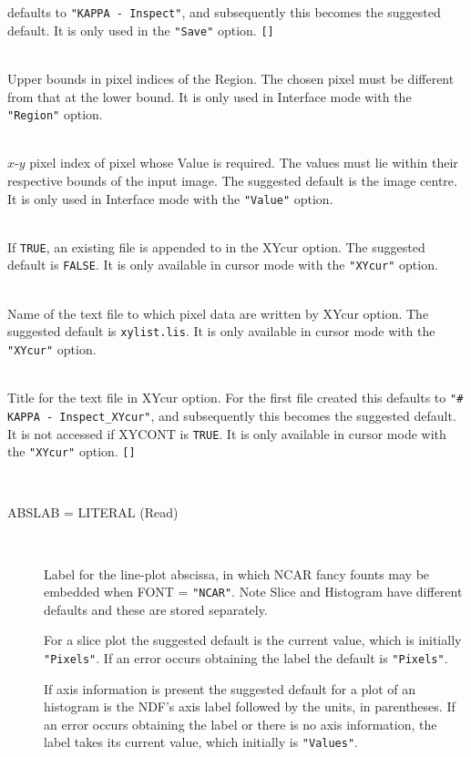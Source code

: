 \documentclass[twoside,11pt]{article}
\newcommand{\sstgraphparameters}[1]{
   \goodbreak
   \item[Graphics-style Parameters:] \mbox{} \\
   \vspace{-3.5ex}
   \begin{description}
      #1
   \end{description}
}
\newcommand{\sstsubsection}[1]{ \item[{#1}] \mbox{} \\}
\newcommand{\sstsubsection}[1]{\item[{#1}]}
\begin{document}
{{{         defaults to {\tt "KAPPA - Inspect"}, and subsequently this becomes
         the suggested default.  It is only used in the {\tt "Save"} option.
         {\tt []}
      }
      \sstsubsection{
         UBOUND( 2 ) = \_INTEGER (Read)
      }{
         Upper bounds in pixel indices of the Region.  The chosen pixel
         must be different from that at the lower bound.  It is only
         used in Interface mode with the {\tt "Region"} option.
      }
      \sstsubsection{
         VAIND( 2 ) = \_INTEGER (Read)
      }{
         $x$-$y$ pixel index of pixel whose Value is required.  The values
         must lie within their respective bounds of the input image.
         The suggested default is the image centre.  It is only used in
         Interface mode with the {\tt "Value"} option.
      }
      \sstsubsection{
         XYCONT = \_LOGICAL (Read)
      }{
         If {\tt TRUE}, an existing file is appended to in the XYcur option.
         The suggested default is {\tt FALSE}.  It is only available in
         cursor mode with the {\tt "XYcur"} option.
      }
      \sstsubsection{
         XYFILE = FILENAME (Update)
      }{
         Name of the text file to which pixel data are written by
         XYcur option.  The suggested default is {\tt xylist.lis}.  It is
         only available in cursor mode with the {\tt "XYcur"} option.
      }
      \sstsubsection{
         XYTITLE = LITERAL (Read)
      }{
         Title for the text file in XYcur option.  For the first file
         created this defaults to {\tt "\# KAPPA - Inspect\_XYcur"}, and
         subsequently this becomes the suggested default. It is not
         accessed if XYCONT is {\tt TRUE}.   It is only available in cursor
         mode with the {\tt "XYcur"} option. {\tt []}
      }
   }
   \sstgraphparameters{
      \sstsubsection{
         ABSLAB  =  LITERAL (Read)
      }{
         Label for the line-plot abscissa, in which NCAR fancy founts
         may be embedded when FONT = {\tt "NCAR"}.  Note Slice and
         Histogram have different defaults and these are stored separately.

         For a slice plot the suggested default is the current value,
         which is initially {\tt "Pixels"}.  If an error occurs obtaining the
         label the default is {\tt "Pixels"}.

         If axis information is present the suggested default for a
         plot of an histogram is the NDF's axis label followed by the
         units, in parentheses.  If an error occurs obtaining the label
         or there is no axis information, the label takes its current
         value, which initially is {\tt "Values"}.

}}}
\end{document}
